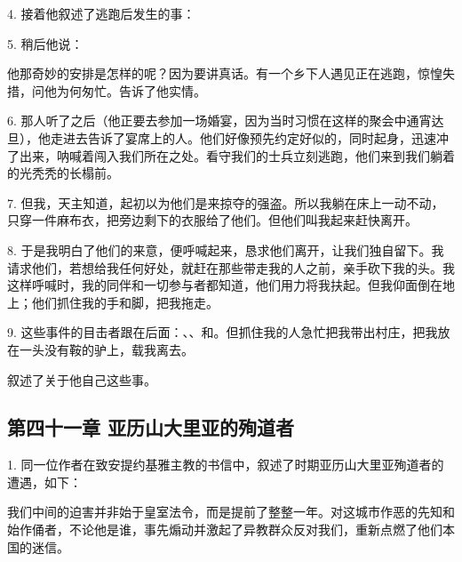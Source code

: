 4. 接着他叙述了逃跑后发生的事：\par

\par

5. 稍后他说：\par

他那奇妙的安排是怎样的呢？因为要讲真话。有一个乡下人遇见正在逃跑，惊惶失措，问他为何匆忙。告诉了他实情。\par

6. 那人听了之后（他正要去参加一场婚宴，因为当时习惯在这样的聚会中通宵达旦），他走进去告诉了宴席上的人。他们好像预先约定好似的，同时起身，迅速冲了出来，呐喊着闯入我们所在之处。看守我们的士兵立刻逃跑，他们来到我们躺着的光秃秃的长榻前。\par

7. 但我，天主知道，起初以为他们是来掠夺的强盗。所以我躺在床上一动不动，只穿一件麻布衣，把旁边剩下的衣服给了他们。但他们叫我起来赶快离开。\par

8. 于是我明白了他们的来意，便呼喊起来，恳求他们离开，让我们独自留下。我请求他们，若想给我任何好处，就赶在那些带走我的人之前，亲手砍下我的头。我这样呼喊时，我的同伴和一切参与者都知道，他们用力将我扶起。但我仰面倒在地上；他们抓住我的手和脚，把我拖走。\par

9. 这些事件的目击者跟在后面：、、和。但抓住我的人急忙把我带出村庄，把我放在一头没有鞍的驴上，载我离去。\par

叙述了关于他自己这些事。\par


\subsection{第四十一章 亚历山大里亚的殉道者}

1. 同一位作者在致安提约基雅主教的书信中，叙述了时期亚历山大里亚殉道者的遭遇，如下：\par

我们中间的迫害并非始于皇室法令，而是提前了整整一年。对这城市作恶的先知和始作俑者，不论他是谁，事先煽动并激起了异教群众反对我们，重新点燃了他们本国的迷信。\par

